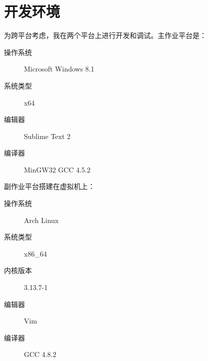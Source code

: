 \section{开发环境}

为跨平台考虑，我在两个平台上进行开发和调试。主作业平台是：
\begin{description}
\item[操作系统] Microsoft Windows 8.1
\item[系统类型] x64
\item[编辑器] Sublime Text 2
\item[编译器] MinGW32 GCC 4.5.2
\end{description}

副作业平台搭建在虚拟机上：
\begin{description}
\item[操作系统] Arch Linux
\item[系统类型] x86\_64
\item[内核版本] 3.13.7-1
\item[编辑器] Vim
\item[编译器] GCC 4.8.2
\end{description}
